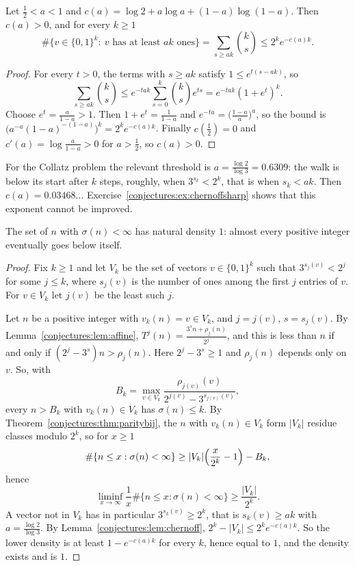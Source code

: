 \begin{lemma}\label{conjectures:lem:chernoff}
Let $\frac12<a<1$ and $c(a)=\log2+a\log a+(1-a)\log(1-a)$. Then $c(a)>0$, and for every $k\ge1$
\[
\#\bigl\{v\in\{0,1\}^k:\ v\text{ has at least }ak\text{ ones}\bigr\}=\sum_{s\ge ak}\binom ks\le2^ke^{-c(a)k}.
\]
\end{lemma}
\begin{proof}
For every $t>0$, the terms with $s\ge ak$ satisfy $1\le e^{t(s-ak)}$, so
\[
\sum_{s\ge ak}\binom ks\le e^{-tak}\sum_{s=0}^k\binom kse^{ts}=e^{-tak}(1+e^t)^k.
\]
Choose $e^t=\frac a{1-a}>1$. Then $1+e^t=\frac1{1-a}$ and $e^{-ta}=\bigl(\frac{1-a}a\bigr)^a$, so the bound is
$\bigl(a^{-a}(1-a)^{-(1-a)}\bigr)^k=2^ke^{-c(a)k}$. Finally $c(\frac12)=0$ and $c'(a)=\log\frac a{1-a}>0$ for $a>\frac12$, so $c(a)>0$.
\end{proof}

For the Collatz problem the relevant threshold is $a=\frac{\log2}{\log3}=0.6309$: the walk is below its start after $k$ steps, roughly, when
$3^{s_k}<2^k$, that is when $s_k<ak$. Then $c(a)=0.03468\ldots$ Exercise~\ref{conjectures:ex:chernoffsharp} shows that this exponent cannot be improved.

\begin{theorem}[Terras, 1976]\label{conjectures:thm:terras}
The set of $n$ with $\sigma(n)<\infty$ has natural density $1$: almost every positive integer eventually goes below itself.
\end{theorem}
\begin{proof}
Fix $k\ge1$ and let $V_k$ be the set of vectors $v\in\{0,1\}^k$ such that $3^{s_j(v)}<2^j$ for some $j\le k$, where $s_j(v)$ is the number of ones among
the first $j$ entries of $v$. For $v\in V_k$ let $j(v)$ be the least such $j$.

Let $n$ be a positive integer with $v_k(n)=v\in V_k$, and $j=j(v)$, $s=s_j(v)$. By Lemma~\ref{conjectures:lem:affine}, $T^j(n)=\frac{3^sn+\rho_j(n)}{2^j}$, and this
is less than $n$ if and only if $(2^j-3^s)n>\rho_j(n)$. Here $2^j-3^s\ge1$ and $\rho_j(n)$ depends only on $v$. So, with
\[
B_k=\max_{v\in V_k}\frac{\rho_{j(v)}(v)}{2^{j(v)}-3^{s_{j(v)}(v)}},
\]
every $n>B_k$ with $v_k(n)\in V_k$ has $\sigma(n)\le k$. By Theorem~\ref{conjectures:thm:paritybij}, the $n$ with $v_k(n)\in V_k$ form $|V_k|$ residue classes
modulo $2^k$, so for $x\ge1$
\[
\#\{n\le x:\sigma(n)<\infty\}\ge|V_k|\Bigl(\frac x{2^k}-1\Bigr)-B_k,
\]
hence
\[
\liminf_{x\to\infty}\frac1x\#\{n\le x:\sigma(n)<\infty\}\ge\frac{|V_k|}{2^k}.
\]
A vector not in $V_k$ has in particular $3^{s_k(v)}\ge2^k$, that is $s_k(v)\ge ak$ with $a=\frac{\log2}{\log3}$. By Lemma~\ref{conjectures:lem:chernoff},
$2^k-|V_k|\le2^ke^{-c(a)k}$. So the lower density is at least $1-e^{-c(a)k}$ for every $k$, hence equal to $1$, and the density exists and is $1$.
\end{proof}

